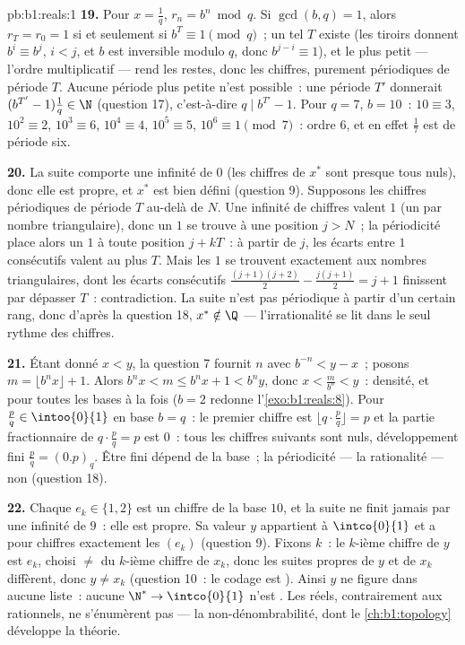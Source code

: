 \begin{solution}{pb:b1:reals:1}
\textbf{19.} Pour $x = \frac 1q$, $r_n = b^n \bmod q$. Si
$\gcd(b, q) = 1$, alors $r_T = r_0 = 1$ si et seulement si $b^T
\equiv 1 \pmod q$~; un tel $T$ existe (les tiroirs donnent $b^i
\equiv b^j$, $i < j$, et $b$ est inversible modulo $q$, donc
$b^{j-i} \equiv 1$), et le plus petit --- l'ordre multiplicatif ---
rend les restes, donc les chiffres, purement périodiques de période
$T$. Aucune période plus petite n'est possible~: une période $T'$
donnerait $(b^{T'} - 1)\frac1q \in \N$ (question 17), c'est-à-dire
$q \mid b^{T'} - 1$. Pour $q = 7$, $b = 10$~: $10 \equiv 3$, $10^2
\equiv 2$, $10^3 \equiv 6$, $10^4 \equiv 4$, $10^5 \equiv 5$, $10^6
\equiv 1 \pmod 7$~: ordre $6$, et en effet $\frac 17$ est de
période six.

\textbf{20.} La suite comporte une infinité de $0$ (les chiffres de
$x^*$ sont presque tous nuls), donc elle est propre, et $x^*$ est
bien défini (question 9). Supposons les chiffres périodiques de
période $T$ au-delà de $N$. Une infinité de chiffres valent $1$ (un
par nombre triangulaire), donc un $1$ se trouve à une position $j >
N$~; la périodicité place alors un $1$ à toute position $j + kT$~:
à partir de $j$, les écarts entre $1$ consécutifs valent au plus
$T$. Mais les $1$ se trouvent exactement aux nombres triangulaires,
dont les écarts consécutifs $\frac{(j+1)(j+2)}{2} -
\frac{j(j+1)}{2} = j + 1$ finissent par dépasser $T$~:
contradiction. La suite n'est pas périodique à partir d'un certain
rang, donc d'après la question 18, $x^* \notin \Q$ ---
l'irrationalité se lit dans le seul rythme des chiffres.

\textbf{21.} Étant donné $x < y$, la question 7 fournit $n$ avec
$b^{-n} < y - x$~; posons $m = \lfloor b^n x \rfloor + 1$. Alors
$b^n x < m \leq b^n x + 1 < b^n y$, donc $x < \frac{m}{b^n} < y$~:
densité, et pour toutes les bases à la fois ($b = 2$ redonne
l'\cref{exo:b1:reals:8}). Pour $\frac pq \in \intoo{0}{1}$ en base
$b = q$~: le premier chiffre est $\lfloor q \cdot \frac pq \rfloor
= p$ et la partie fractionnaire de $q \cdot \frac pq = p$ est
$0$~: tous les chiffres suivants sont nuls, développement fini
$\frac pq = (0.p)_q$. Être fini dépend de la base~; la périodicité
--- la rationalité --- non (question 18).

\textbf{22.} Chaque $e_k \in \{1, 2\}$ est un chiffre de la base
$10$, et la suite ne finit jamais par une infinité de $9$~: elle est
propre. Sa valeur $y$ appartient à $\intco{0}{1}$ et a pour chiffres
exactement les $(e_k)$ (question 9). Fixons $k$~: le $k$-ième
chiffre de $y$ est $e_k$, choisi $\neq$ du $k$-ième chiffre de
$x_k$, donc les suites propres de $y$ et de $x_k$ diffèrent, donc $y
\neq x_k$ (question 10~: le codage est ). Ainsi $y$ ne
figure dans aucune liste~: aucune  $\N^* \to
\intco{0}{1}$ n'est . Les réels, contrairement aux
rationnels, ne s'énumèrent pas --- la non-dénombrabilité, dont le
\cref{ch:b1:topology} développe la théorie.


\end{solution}

